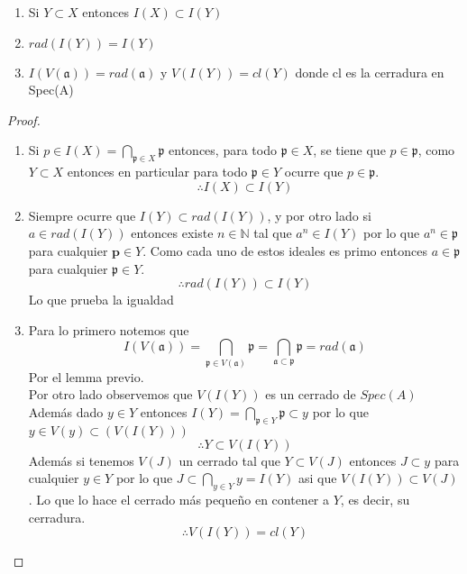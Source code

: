 \documentclass{article}
\begin{document}
\begin{lema}{}{}
    \begin{enumerate}
        \item Si $Y \subset X$ entonces $I(X) \subset I(Y)$
        \item $rad(I(Y)) = I(Y)$
        \item $I(V(\mathfrak{a})) = rad(\mathfrak{a}) $
        y $V(I(Y)) = cl(Y)$ donde cl es la cerradura en Spec(A)
        \end{enumerate}
\end{lema}
\begin{proof}
    \begin{enumerate}
        \item Si $p \in I(X) = \bigcap_{\mathfrak{p}\in X}\mathfrak{p}$
        entonces, para todo $\mathfrak{p}\in X$, se tiene que $p\in \mathfrak{p}$,
        como $Y \subset X$ entonces en particular para todo $\mathfrak{p}\in Y$
        ocurre que $p \in \mathfrak{p}$.
        $$\therefore I(X) \subset I(Y)$$
        \item Siempre ocurre que $I(Y)\subset rad(I(Y))$, y por otro lado
        si $a \in rad(I(Y))$ entonces existe $n\in \mathbb{N}$ tal que $a^n \in I(Y)$
        por lo que $a^n \in \mathfrak{p}$ para cualquier $\mathbf{p}\in Y$. 
        Como cada uno de estos ideales es primo entonces $a \in \mathfrak{p}$ para cualquier 
        $\mathfrak{p}\in Y$.
        $$\therefore rad(I(Y)) \subset I(Y)$$
        Lo que prueba la igualdad
        \item Para lo primero notemos que
        $$I(V(\mathfrak{a}))=\bigcap_{\mathfrak{p}\in V(\mathfrak{a})} \mathfrak{p}
        = \bigcap_{\mathfrak{a}\subset \mathfrak{p}} \mathfrak{p}
        = rad(\mathfrak{a})$$
        Por el lemma previo.
        \\
        Por otro lado observemos que $V(I(Y))$ es un cerrado de $Spec(A)$
        Además dado $y\in Y$ entonces $I(Y) = \bigcap_{\mathfrak{p}\in Y} \mathfrak{p}
        \subset y $ por lo que $y \in V(y) \subset (V(I(Y)))$
        $$\therefore Y\subset V(I(Y))$$
        Además si tenemos $V(J)$ un cerrado tal que $Y \subset V(J)$ entonces
        $J \subset y$ para cualquier $y \in Y$ por lo que $J \subset \bigcap_{y \in Y} y = I(Y)$
        asi que $V(I(Y)) \subset V(J)$.
        Lo que lo hace el cerrado más pequeño en contener a $Y$, es decir,
        su cerradura.
        $$\therefore V(I(Y)) = cl(Y)$$
    \end{enumerate}
\end{proof}
\end{document}
